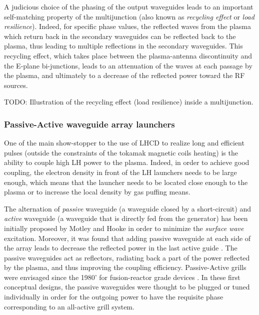 A judicious choice of the phasing of the output waveguides leads to an important self-matching property of the multijunction (also known as \emph{recycling effect} or \emph{load resilience}). Indeed, for specific phase values, the reflected waves from the plasma which return back in the secondary waveguides can be reflected back to the plasma, thus leading to multiple reflections in the secondary waveguides. This recycling effect, which takes place between the plasma-antenna discontinuity and the E-plane bi-junctions, leads to an attenuation of the waves at each passage by the plasma, and ultimately to a decrease of the reflected power toward the RF sources. 

TODO: Illustration of the recycling effect (load resilience) inside a multijunction.



\subsubsection{Passive-Active waveguide array launchers}
One of the main show-stopper to the use of LHCD to realize long and efficient pulses (outside the constraints of the tokamak magnetic coils heating) is the ability to couple high LH power to the plasma. Indeed, in order to achieve good coupling, the electron density in front of the LH launchers needs to be large enough, which means that the launcher needs to be located close enough to the plasma or to increase the local density by gas puffing means. 

The alternation of \emph{passive} waveguide (a waveguide closed by a short-circuit) and \emph{active} waveguide (a waveguide that is directly fed from the generator) has been initially proposed by Motley and Hooke  in order to minimize the \emph{surface wave} excitation. Moreover, it was found that adding passive waveguide at each side of the array leads to decrease the reflected power in the last active guide . The passive waveguides act as reflectors, radiating back a part of the power reflected by the plasma, and thus improving the coupling efficiency. Passive-Active grills were envisaged since the 1980' for fusion-reactor grade devices . In these first conceptual designs, the passive waveguides were thought to be plugged or tuned individually in order for the outgoing power to have the requisite phase corresponding to an all-active grill system. 

